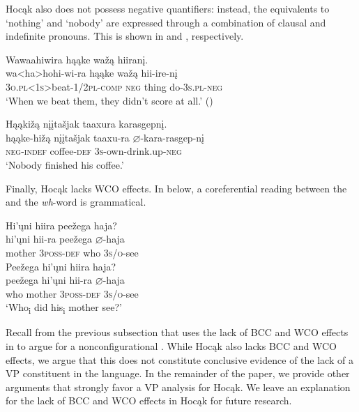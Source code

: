 \documentclass[output=paper]{LSP/langsci}
\begin{document}
Hocąk also does not possess negative quantifiers: instead, the equivalents to `nothing' and `nobody' are expressed through a combination of clausal  and indefinite pronouns. This is shown in and , respectively.

\ea\label{ex:jrs:20}
\ea\label{ex:jrs:20a)}
\glll Wawaahiwira 	hąąke 	wa\v{z}ą 	hiiran\k{i}. \\
wa<ha>hohi-wi-ra 						hąąke 	wa\v{z}ą 	hii-ire-n\k{i} \\
	\textsc{3o.pl<1s>}beat-\textsc{1/2pl}-\textsc{comp} \textsc{neg}		thing 	do-\textsc{3s.pl-neg} \\
\trans `When we beat them, they didn't score at all.' (\citealt{Hartmann2012}) 

\ex \label{ex:jrs:20b}
\glll Hąąki\v{z}ą 	{n\k{i}\k{i}ta\v{s}jak taaxura} 	karasgepn\k{i}. \\
hąąke-hi\v{z}ą  {n\k{i}\k{i}ta\v{s}jak taaxu-ra }	$\varnothing$-kara-rasgep-n\k{i} \\
	\textsc{neg-indef} 	coffee-\textsc{def}	\textsc{3s}-own-drink.up-\textsc{neg} \\
\trans `Nobody finished his coffee.'
\z 
\z 
	
Finally, Hocąk lacks WCO effects. In  below, a coreferential reading between the  and the  \textit{wh}-word is grammatical.

\begin{exe}
\ex\label{ex:jrs:21}
\begin{xlist} 	
\ex
\glll Hi'\k{u}ni		hiira					pee\v{z}ega		haja? \\
hi'\k{u}ni		hii-ra 			pee\v{z}ega		$\varnothing$-haja \\
	mother		3\textsc{poss-def}		who	\textsc{3s/o}-see \\ 
    
\ex
\glll Pee\v{z}ega 	hi'\k{u}ni 		hiira		haja?\\
pee\v{z}ega 	hi'\k{u}ni 		hii-ra 		$\varnothing$-haja \\
	who 	mother 	3\textsc{poss-def} 	\textsc{3s/o}-see \\
\trans `Who\textsubscript{i} did his\textsubscript{i} mother see?'
\end{xlist}
\end{exe}

Recall from the previous subsection that \citet{VanValin1985,VanValin1987} uses the lack of BCC and WCO effects in  to argue for a nonconfigurational . While Hocąk also lacks BCC and WCO effects, we argue that this does not constitute conclusive evidence of the lack of a VP constituent in the language. In the remainder of the paper, we provide other arguments that strongly favor a VP analysis for Hocąk. We leave an explanation for the lack of BCC and WCO effects in Hocąk for future research.
\end{document}
